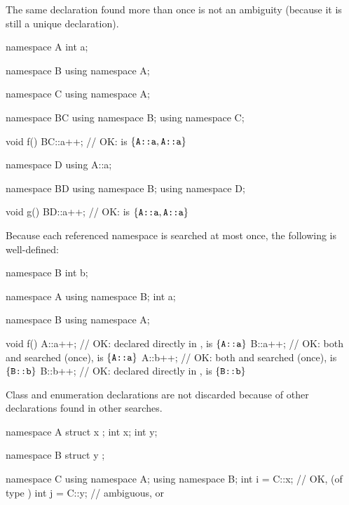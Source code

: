 \pnum
\begin{note}
The same declaration found more than once is not an ambiguity (because
it is still a unique declaration).
\begin{example}
\begin{codeblock}
namespace A {
  int a;
}

namespace B {
  using namespace A;
}

namespace C {
  using namespace A;
}

namespace BC {
  using namespace B;
  using namespace C;
}

void f()
{
  BC::a++;          // OK:  is $\{ \texttt{A::a}, \texttt{A::a} \}$
}

namespace D {
  using A::a;
}

namespace BD {
  using namespace B;
  using namespace D;
}

void g()
{
  BD::a++;          // OK:  is $\{ \texttt{A::a}, \texttt{A::a} \}$
}
\end{codeblock}
\end{example}
\end{note}

\pnum
\begin{example}
Because each referenced namespace is searched at most once, the
following is well-defined:
\begin{codeblock}
namespace B {
  int b;
}

namespace A {
  using namespace B;
  int a;
}

namespace B {
  using namespace A;
}

void f()
{
  A::a++;           // OK:  declared directly in ,  is $\{ \texttt{A::a} \}$
  B::a++;           // OK: both  and  searched (once),  is $\{ \texttt{A::a} \}$
  A::b++;           // OK: both  and  searched (once),  is $\{ \texttt{B::b} \}$
  B::b++;           // OK:  declared directly in ,  is $\{ \texttt{B::b} \}$
}
\end{codeblock}
\end{example}

\pnum
\begin{note}
Class and enumeration declarations are not discarded
because of other declarations found in other searches.
\end{note}
\begin{example}
\begin{codeblock}
namespace A {
  struct x { };
  int x;
  int y;
}

namespace B {
  struct y { };
}

namespace C {
  using namespace A;
  using namespace B;
  int i = C::x;     // OK,  (of type )
  int j = C::y;     // ambiguous,  or 
}
\end{codeblock}
\end{example}

